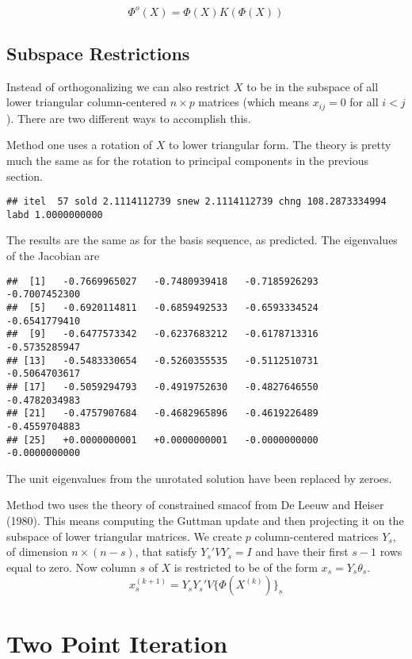 \documentclass[
  12pt,
]{article}
\begin{document}
\[
\Phi^o(X)=\Phi(X)K(\Phi(X))
\]

\subsection{Subspace Restrictions}\label{subspace-restrictions}

Instead of orthogonalizing we can also restrict \(X\) to be in the subspace
of all lower triangular column-centered \(n\times p\) matrices (which means \(x_{ij}=0\)
for all \(i<j\)). There are two different ways to accomplish this.

Method one uses a rotation of \(X\) to lower triangular form. The theory
is pretty much the same as for the rotation to principal components
in the previous section.

\begin{verbatim}
## itel  57 sold 2.1114112739 snew 2.1114112739 chng 108.2873334994 labd 1.0000000000
\end{verbatim}

The results are the same as for the basis sequence, as predicted. The eigenvalues of the Jacobian are

\begin{verbatim}
##  [1]   -0.7669965027   -0.7480939418   -0.7185926293   -0.7007452300
##  [5]   -0.6920114811   -0.6859492533   -0.6593334524   -0.6541779410
##  [9]   -0.6477573342   -0.6237683212   -0.6178713316   -0.5735285947
## [13]   -0.5483330654   -0.5260355535   -0.5112510731   -0.5064703617
## [17]   -0.5059294793   -0.4919752630   -0.4827646550   -0.4782034983
## [21]   -0.4757907684   -0.4682965896   -0.4619226489   -0.4559704883
## [25]   +0.0000000001   +0.0000000001   -0.0000000000   -0.0000000000
\end{verbatim}

The unit eigenvalues from the unrotated solution have been replaced by zeroes.

Method two uses the theory of constrained smacof from De Leeuw and Heiser (1980). This
means computing the Guttman update and then projecting it on the subspace of
lower triangular matrices. We create \(p\) column-centered matrices \(Y_s\), of dimension \(n\times(n-s)\), that satisfy \(Y_s'VY_s=I\) and have their first \(s-1\) rows equal to zero. Now column \(s\) of \(X\) is restricted to be of the form \(x_s=Y_s\theta_s\).
\[
x_s^{(k+1)}=Y_sY_s'V\{\Phi(X^{(k)})\}_s
\]

\section{Two Point Iteration}\label{two-point-iteration}
\end{document}
